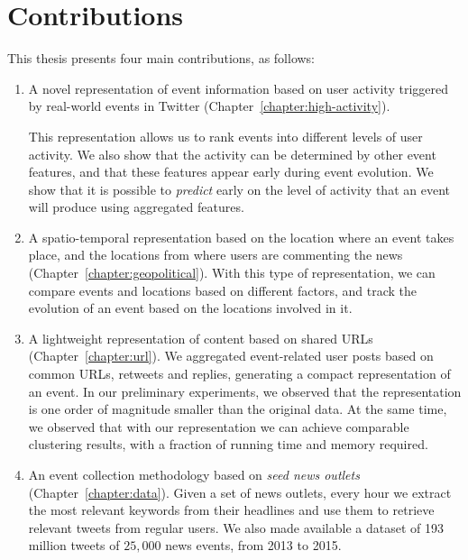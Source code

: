 \section{Contributions} 

This thesis presents four main contributions, as follows:

\begin{enumerate}
    \setlength\itemsep{0.5em}

\item A novel representation of event information based on user activity
triggered by real-world events in Twitter (Chapter~\ref{chapter:high-activity}).

%
This representation allows us to rank events into different levels of user
activity. 
%
We also show that the activity can be determined by other event features, and
that these features appear early during event evolution.
%
We show that it is possible to {\em predict} early on the level of activity that
an event will produce using aggregated features.

\item A spatio-temporal representation based on the location where an event
takes place, and the locations from where users are commenting the news
(Chapter~\ref{chapter:geopolitical}).
%
With this type of representation, we can compare events and locations based on
different factors, and track the evolution of an event based on the locations
involved in it.

\item A lightweight representation of content based on shared URLs
(Chapter~\ref{chapter:url}).
%
We aggregated event-related user posts based on common URLs, retweets
and replies, generating a compact representation of an event.
%
In our preliminary experiments, we observed that the representation is one order
of magnitude smaller than the original data.
%
At the same time, we observed that with our representation we can achieve
comparable clustering results, with a fraction of running time and memory
required.

\item An event collection methodology based on {\em seed news outlets}
(Chapter~\ref{chapter:data}).
%
Given a set of news outlets, every hour we extract the most relevant keywords
from their headlines and use them to retrieve relevant tweets from regular
users.
%
We also made available a dataset of 193 million tweets of $25,000$ news events,
from 2013 to 2015.
\end{enumerate}

